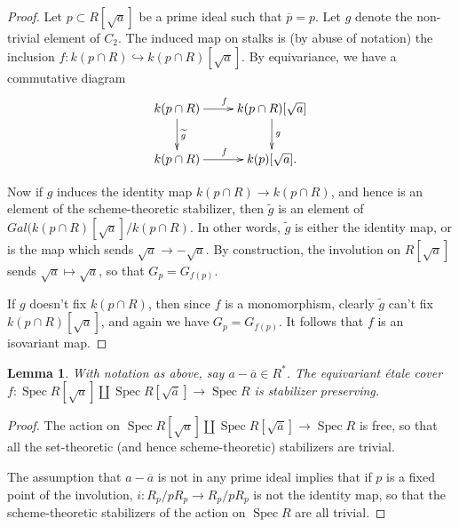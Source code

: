 \documentclass[draftthesis,tocnosub,noragright,centerchapter,10pt]{uiucthesis2009}
\DeclareMathOperator{\Spec}{Spec}
\theoremstyle{plain}
\newtheorem{lemma}{Lemma}
\newtheorem{proposition}[lemma]{Proposition}
\theoremstyle{definition}
\begin{document}
\begin{proof}
Let $p \subset
R[\sqrt{a}]$ be a prime ideal such that $\overline p = p$. Let $g$ denote the
non-trivial element of $C_2$. The induced map on stalks is (by abuse
of notation) the
inclusion $f : k(p \cap R) \hookrightarrow k(p \cap R)[\sqrt{a}]$. By equivariance,
we have a commutative diagram
\[
\xymatrix{k(p \cap R) \ar[r]^f \ar[d]^{\widetilde g} & k(p \cap R)[\sqrt{a}] \ar[d]^g \\
  k(p \cap R) \ar[r]^f & k(p)[\sqrt{a}].}
\]

Now if $g$ induces the identity map $k(p \cap R) \rightarrow k(p \cap
R)$, and hence is an element of the scheme-theoretic stabilizer, then
$\widetilde g$ is an element of $Gal(k(p \cap R)[\sqrt{a}]/k(p \cap
R)$. In other words, $\widetilde g$ is either the identity map, or is
the map which sends $\sqrt{a} \rightarrow -\sqrt{a}$. By construction,
the involution on $R[\sqrt{a}]$ sends $\sqrt{a} \mapsto \sqrt{a}$, so
that $G_p = G_{f(p)}$.

If $g$ doesn't fix $k(p \cap R)$, then since $f$ is a monomorphism, clearly $\widetilde g$ can't
fix $k(p \cap R)[\sqrt{a}]$, and again we have $G_p = G_{f(p)}$. It
follows that $f$ is an isovariant map. 
\end{proof}







\begin{lemma}
With notation as above, say $a - 
\overline a \in R^*$. The equivariant \'etale cover $f : \Spec R[\sqrt{a}] \coprod \Spec
R[\sqrt{\overline a}] \rightarrow \Spec R$ is stabilizer preserving.
\end{lemma}

\begin{proof}
The action on $ \Spec R[\sqrt{a}] \coprod \Spec
R[\sqrt{\overline a}] \rightarrow \Spec R$ is free, so that all the
set-theoretic (and hence scheme-theoretic) stabilizers are trivial. 

The assumption that $a - \overline a$ is not in any prime ideal implies that
if $p$ is a fixed point of the involution, $i : R_p/pR_p \rightarrow
R_p/pR_p$ is not the identity map, so that the scheme-theoretic
stabilizers of the action on $\Spec R$ are all trivial.
\end{proof}
\end{document}
